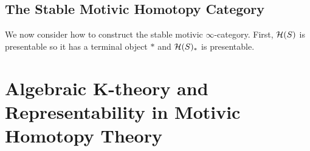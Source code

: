 \documentclass[12pt]{article}
\numberwithin{equation}{section}
\numberwithin{lemma}{section}
\numberwithin{theorem}{section}
\numberwithin{proposition}{section}
\numberwithin{corollary}{section}
\numberwithin{definition}{section}
\numberwithin{example}{section}
\numberwithin{remark}{section}
\begin{document}
\subsection{The Stable Motivic Homotopy Category}

We now consider how to construct the stable motivic
$\infty$-category. First, $\mathcal{H}(S)$ is presentable so it has a terminal
object $*$ and $\mathcal{H}(S)_{*}$ is presentable.


\section{Algebraic K-theory and Representability in Motivic Homotopy
  Theory}





\nocite{*}



\printindex
\end{document}
